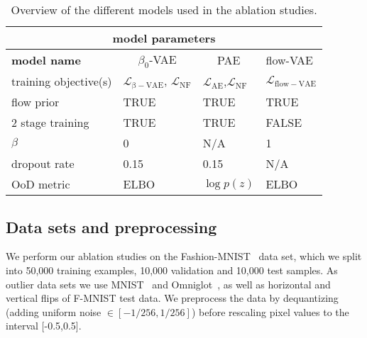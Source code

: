 \documentclass[10pt]{article} \usepackage[accepted]{tmlr}
\begin{document}
\begin{table}[h]
\begin{center}
\begin{tabular}{llll}
\multicolumn{4}{c}{\textbf{model parameters}}                                                                                                                                                    \\ \hline
\multicolumn{1}{l|}{\textbf{model name}}   & \multicolumn{1}{c|}{$\beta_0$-VAE } & \multicolumn{1}{c|}{PAE}         & \multicolumn{1}{l}{flow-VAE}\\ \hline
\multicolumn{1}{l|}{training objective(s)} & \multicolumn{1}{l|}{$\mathcal{L}_{\mathrm{\beta-VAE}}$, $\mathcal{L}_{\mathrm{NF}}$}       & \multicolumn{1}{l|}{$\mathcal{L}_{\mathrm{AE}}$,$\mathcal{L}_{\mathrm{NF}}$}    & \multicolumn{1}{l}{$\mathcal{L}_{\mathrm{flow-VAE}}$}          \\ 
\multicolumn{1}{l|}{flow prior}            & \multicolumn{1}{l|}{TRUE}                 & \multicolumn{1}{l|}{TRUE}                     & \multicolumn{1}{l}{TRUE }              \\ 
\multicolumn{1}{l|}{2 stage training}      & \multicolumn{1}{l|}{TRUE}                & \multicolumn{1}{l|}{TRUE}                      & \multicolumn{1}{l}{FALSE}                  \\
\multicolumn{1}{l|}{$\beta$}               & \multicolumn{1}{l|}{0}                    & \multicolumn{1}{l|}{N/A}                      & \multicolumn{1}{l}{1}                     \\
\multicolumn{1}{l|}{dropout rate}          & \multicolumn{1}{l|}{0.15}                 & \multicolumn{1}{l|}{0.15}                     & \multicolumn{1}{l}{N/A}                       \\
\multicolumn{1}{l|}{OoD metric}            & \multicolumn{1}{l|}{ELBO}                 & \multicolumn{1}{l|}{$\log p(z)$}                 & \multicolumn{1}{l}{ELBO}                     \\
\end{tabular}
\end{center}
\caption{\label{tab:models}Overview of the different models used in the ablation studies.}
\end{table}
\subsection{Data sets and preprocessing}
We perform our ablation studies on the Fashion-MNIST~\citep{f-mnist} data set, which we split into 50,000 training examples, 10,000 validation and 10,000 test samples. As outlier data sets we use MNIST~\citep{LecunMNIST} and Omniglot~\citep{OMNIGLOT}, as well as horizontal and vertical flips of F-MNIST test data. We preprocess the data by dequantizing (adding uniform noise $\in[-1/256,1/256]$) before rescaling pixel values to the interval [-0.5,0.5].
\end{document}
